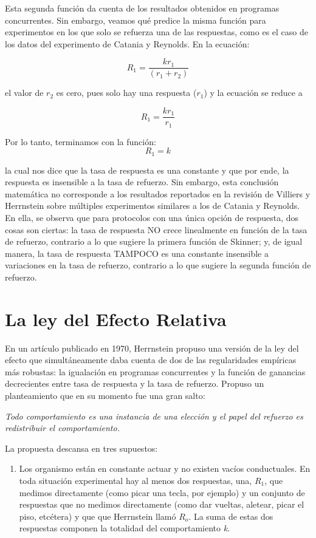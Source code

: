 \documentclass[
  letterpaper,
]{book}
\providecommand{\tightlist}{%
  \setlength{\itemsep}{0pt}\setlength{\parskip}{0pt}}\usepackage{longtable,booktabs,array}
\begin{document}
Esta segunda función da cuenta de los resultados obtenidos en programas
concurrentes. Sin embargo, veamos qué predice la misma función para
experimentos en los que solo se refuerza una de las respuestas, como es
el caso de los datos del experimento de Catania y Reynolds. En la
ecuación:

\[
R_1 = \frac{kr_1}{(r_1 + r_2)}
\]

el valor de \(r_2\) es cero, pues solo hay una respuesta (\(r_1\)) y la
ecuación se reduce a

\[
R_1 = \frac {kr_1} {r_1 }
\]

Por lo tanto, terminamos con la función:\\
\[
R_1 = k
\]

la cual nos dice que la tasa de respuesta es una constante y que por
ende, la respuesta es insensible a la tasa de refuerzo. Sin embargo,
esta conclusión matemática no corresponde a los resultados reportados en
la revisión de Villiers y Herrnstein sobre múltiples experimentos
similares a los de Catania y Reynolds. En ella, se observa que para
protocolos con una única opción de respuesta, dos cosas son ciertas: la
tasa de respuesta NO crece linealmente en función de la tasa de
refuerzo, contrario a lo que sugiere la primera función de Skinner; y,
de igual manera, la tasa de respuesta TAMPOCO es una constante
insensible a variaciones en la tasa de refuerzo, contrario a lo que
sugiere la segunda función de refuerzo.

\section{La ley del Efecto Relativa}\label{la-ley-del-efecto-relativa}

En un artículo publicado en 1970, Herrnstein propuso una versión de la
ley del efecto que simultáneamente daba cuenta de dos de las
regularidades empíricas más robustas: la igualación en programas
concurrentes y la función de ganancias decrecientes entre tasa de
respuesta y la tasa de refuerzo. Propuso un planteamiento que en su
momento fue una gran salto:

\emph{Todo comportamiento es una instancia de una elección y el papel
del refuerzo es redistribuir el comportamiento.}

La propuesta descansa en tres supuestos:

\begin{enumerate}
\def\labelenumi{\arabic{enumi}.}
\tightlist
\item
  Los organismo están en constante actuar y no existen vacíos
  conductuales. En toda situación experimental hay al menos dos
  respuestas, una, \(R_1\), que medimos directamente (como picar una
  tecla, por ejemplo) y un conjunto de respuestas que no medimos
  directamente (como dar vueltas, aletear, picar el piso, etcétera) y
  que que Herrnstein llamó \(R_o\). La suma de estas dos respuestas
  componen la totalidad del comportamiento \emph{k}.
\end{enumerate}
\end{document}
